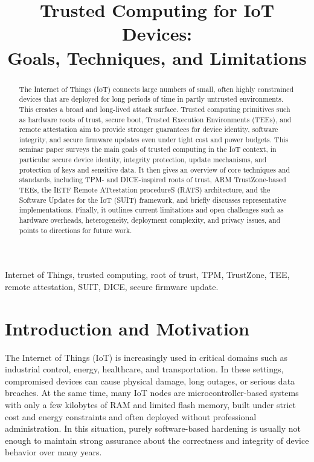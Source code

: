 \documentclass[conference,11pt,a4paper]{IEEEtran}
\begin{document}
\title{Trusted Computing for IoT Devices:\\Goals, Techniques, and Limitations}

\author{
}

\maketitle

\begin{abstract}
The Internet of Things (IoT) connects large numbers of small, often highly constrained devices that are deployed for long periods of time in partly untrusted environments. This creates a broad and long-lived attack surface. Trusted computing primitives such as hardware roots of trust, secure boot, Trusted Execution Environments (TEEs), and remote attestation aim to provide stronger guarantees for device identity, software integrity, and secure firmware updates even under tight cost and power budgets. This seminar paper surveys the main goals of trusted computing in the IoT context, in particular secure device identity, integrity protection, update mechanisms, and protection of keys and sensitive data. It then gives an overview of core techniques and standards, including TPM- and DICE-inspired roots of trust, ARM TrustZone-based TEEs, the IETF Remote ATtestation procedureS (RATS) architecture, and the Software Updates for the IoT (SUIT) framework, and briefly discusses representative implementations. Finally, it outlines current limitations and open challenges such as hardware overheads, heterogeneity, deployment complexity, and privacy issues, and points to directions for future work.
\end{abstract}

\begin{IEEEkeywords}
Internet of Things, trusted computing, root of trust, TPM, TrustZone, TEE, remote attestation, SUIT, DICE, secure firmware update.
\end{IEEEkeywords}

\section{Introduction and Motivation}
The Internet of Things (IoT) is increasingly used in critical domains such as industrial control, energy, healthcare, and transportation. In these settings, compromised devices can cause physical damage, long outages, or serious data breaches. At the same time, many IoT nodes are microcontroller-based systems with only a few kilobytes of RAM and limited flash memory, built under strict cost and energy constraints and often deployed without professional administration. In this situation, purely software-based hardening is usually not enough to maintain strong assurance about the correctness and integrity of device behavior over many years.
\end{document}
